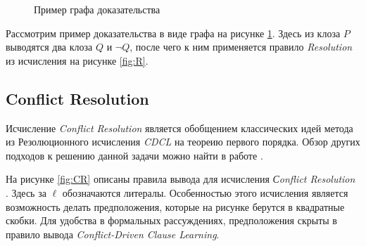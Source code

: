\usetikzlibrary{arrows.meta}
\begin{figure}
\caption{Пример графа доказательства}
\label{fig:graph-example}
\end{figure}

\begin{example}
Рассмотрим пример доказательства в виде графа на рисунке \ref{fig:graph-example}. Здесь из клоза $P$ выводятся два клоза $Q$ и $\neg Q$, после чего к ним применяется правило \emph{Resolution} из исчисления на рисунке \ref{fig:R}.
\end{example}

\subsection{Conflict Resolution}
\label{sec:CR}
Исчисление \emph{Conflict Resolution} является обобщением классических идей метода из Резолюционного исчисления \emph{CDCL} на теореию первого порядка. Обзор других подходов к решению данной задачи можно найти в работе \cite{DBLP:journals/corr/SlaneyP16}. 

На рисунке \ref{fig:CR} описаны правила вывода для исчисления \emph{Сonflict Resolution} \cite{DBLP:journals/corr/SlaneyP16}. Здесь за $\ell$ обозначаются литералы. Особенностью этого исчисления является возможность делать предположения, которые на рисунке берутся в квадратные скобки. Для удобства в формальных рассуждениях, предположения скрыты в правило вывода \emph{Conflict-Driven Clause Learning}.

